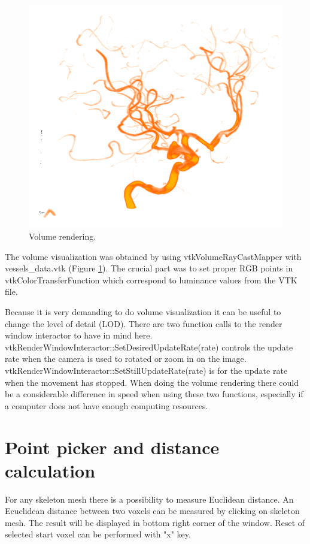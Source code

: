 \begin{figure}
	\centering
	\includegraphics[scale=0.4]{fig/volume-rendering}
	\caption{Volume rendering.}\label{fig:volume-rendering}
\end{figure}

The volume visualization was obtained by using vtkVolumeRayCastMapper with vessels\_data.vtk (Figure \ref{fig:volume-rendering}). The crucial part was to set proper RGB points in vtkColorTransferFunction which correspond to luminance values from the VTK file.

Because it is very demanding to do volume visualization it can be useful to change the level of detail (LOD). There are two function calls to the render window interactor to have in mind here. vtkRenderWindowInteractor::SetDesiredUpdateRate(rate) controls the update rate when the camera is used to rotated or zoom in on the image. vtkRenderWindowInteractor::SetStillUpdateRate(rate) is for the update rate when the movement has stopped. When doing the volume rendering there could be a considerable difference in speed when using these two functions, especially if a computer does not have enough computing resources.

\section{Point picker and distance calculation}

For any skeleton mesh there is a possibility to measure Euclidean distance. An Ecuclidean distance between two voxels can be measured by clicking on skeleton mesh. The result will be displayed in bottom right corner of the window. Reset of selected start voxel can be performed with "x" key.

